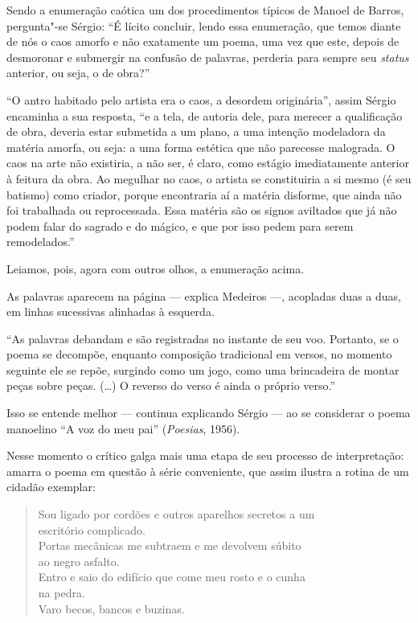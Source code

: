 Sendo a enumeração caótica um dos procedimentos típicos de Manoel de
Barros, pergunta"-se Sérgio: ``É lícito concluir, lendo essa enumeração,
que temos diante de nós o caos amorfo e não exatamente um poema, uma vez
que este, depois de desmoronar e submergir na confusão de palavras,
perderia para sempre seu \emph{status} anterior, ou seja, o de
obra?''

``O antro habitado pelo artista era o caos, a desordem originária'',
assim Sérgio encaminha a sua resposta, ``e a tela, de autoria dele,
para merecer a qualificação de obra, deveria estar submetida a um plano,
a uma intenção modeladora da matéria amorfa, ou seja: a uma forma
estética que não parecesse malograda. O caos na arte não existiria, a
não ser, é claro, como estágio imediatamente anterior à feitura da obra.
Ao megulhar no caos, o artista se constituiria a si mesmo (é seu
batismo) como criador, porque encontraria aí a matéria disforme, que
ainda não foi trabalhada ou reprocessada. Essa matéria são os signos
aviltados que já não podem falar do sagrado e do mágico, e que por isso
pedem para serem remodelados.''

Leiamos, pois, agora com outros olhos, a enumeração acima.

As palavras aparecem na página --- explica Medeiros ---, acopladas duas a duas, em linhas sucessivas alinhadas à
esquerda.

``As palavras debandam e são registradas no instante de seu voo.
Portanto, se o poema se decompõe, enquanto composição tradicional em
versos, no momento seguinte ele se repõe, surgindo como um jogo, como
uma brincadeira de montar peças sobre peças. (\ldots{}) O reverso do verso é
ainda o próprio verso.''

Isso se entende melhor --- continua explicando Sérgio --- ao se considerar
o poema manoelino ``A voz do meu pai'' (\emph{Poesias}, 1956).

Nesse momento o crítico galga mais uma etapa de seu processo de
interpretação: amarra o poema em questão à série conveniente, que assim
ilustra a rotina de um cidadão exemplar:

\begin{verse}
Sou ligado por cordões e outros aparelhos secretos a um \\
escritório complicado. \\
Portas mecânicas me subtraem e me devolvem súbito\\
ao negro asfalto. \\
Entro e saio do edifício que come meu rosto e o cunha\\
na pedra. \\
Varo becos, bancos e buzinas.
\end{verse}

